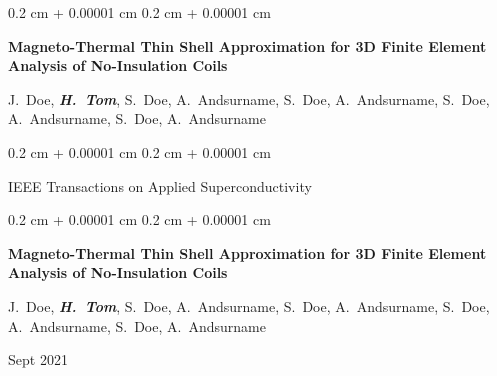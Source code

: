 \documentclass[10pt, letterpaper]{article}
\newenvironment{onecolentry}{
    \begin{adjustwidth}{
        0.2 cm + 0.00001 cm
    }{
        0.2 cm + 0.00001 cm
    }
}{
    \end{adjustwidth}
} %
\newenvironment{twocolentry}[2][]{
    \onecolentry
    \def\secondColumn{#2}
    \setcolumnwidth{\fill, 4.5 cm}
    \begin{paracol}{2}
}{
    \switchcolumn \raggedleft \secondColumn
    \end{paracol}
    \endonecolentry
} %
\begin{document}
        \begin{samepage}
            \begin{onecolentry}
                \textbf{Magneto-Thermal Thin Shell Approximation for 3D Finite Element Analysis of No-Insulation Coils}

                \vspace{0.10 cm}

                \mbox{J. Doe}, \mbox{\textbf{\textit{H. Tom}}}, \mbox{S. Doe}, \mbox{A. Andsurname}, \mbox{S. Doe}, \mbox{A. Andsurname}, \mbox{S. Doe}, \mbox{A. Andsurname}, \mbox{S. Doe}, \mbox{A. Andsurname}
            \end{onecolentry}


            \vspace{0.10 cm}

            \begin{onecolentry}
        IEEE Transactions on Applied Superconductivity    \end{onecolentry}
        \end{samepage}

        \vspace{0.2 cm}

        \begin{samepage}
            \begin{twocolentry}{
                Sept 2021
            }
                \textbf{Magneto-Thermal Thin Shell Approximation for 3D Finite Element Analysis of No-Insulation Coils}

                \vspace{0.10 cm}

                \mbox{J. Doe}, \mbox{\textbf{\textit{H. Tom}}}, \mbox{S. Doe}, \mbox{A. Andsurname}, \mbox{S. Doe}, \mbox{A. Andsurname}, \mbox{S. Doe}, \mbox{A. Andsurname}, \mbox{S. Doe}, \mbox{A. Andsurname}
            \end{twocolentry}


        \end{samepage}

        \vspace{0.2 cm}
\end{document}
